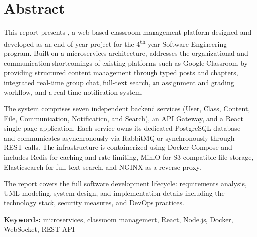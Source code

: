 \chapter*{Abstract}

This report presents \eduspace{}, a web-based classroom management platform designed and developed as an end-of-year project for the 4\textsuperscript{th}-year Software Engineering program.
Built on a microservices architecture, \eduspace{} addresses the organizational and communication shortcomings of existing platforms such as Google Classroom by providing structured content management through typed posts and chapters, integrated real-time group chat, full-text search, an assignment and grading workflow, and a real-time notification system.

The system comprises seven independent backend services (User, Class, Content, File, Communication, Notification, and Search), an API Gateway, and a React single-page application.
Each service owns its dedicated PostgreSQL database and communicates asynchronously via RabbitMQ or synchronously through REST calls.
The infrastructure is containerized using Docker Compose and includes Redis for caching and rate limiting, MinIO for S3-compatible file storage, Elasticsearch for full-text search, and NGINX as a reverse proxy.

The report covers the full software development lifecycle: requirements analysis, UML modeling, system design, and implementation details including the technology stack, security measures, and DevOps practices.

\medskip
\noindent\textbf{Keywords:} microservices, classroom management, React, Node.js, Docker, WebSocket, REST API
